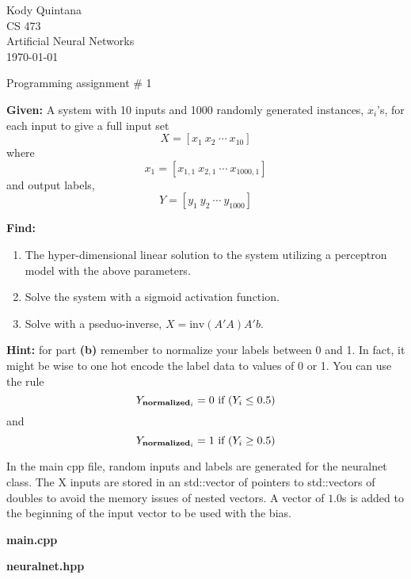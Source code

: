 \documentclass[14pt]{article}
\begin{document}
\begin{flushleft}
 
\large
Kody Quintana\\
CS 473\\
Artificial Neural Networks\\
\today\\
\boldmath

\begin{center}
Programming assignment \# 1
\end{center}

\question
\textbf{Given:}
	A system with 10 inputs and 1000 randomly generated instances, $x_i$'s,
	for each input to give a full input set
	\[X = [x_1  \ x_2  \ \cdots \ x_{10}]\]
	where
	\[x_1 = [x_{1,1} \  x_{2,1}  \ \cdots \  x_{1000,1}]\]
	and output labels,
	\[Y = [y_1 \ y_2 \ \cdots \ y_{1000}]\]
\closequestion

\question
\textbf{Find:}
	\begin{enumerate}[label = \textbf{(\alph*)}]
	\item
		The hyper-dimensional linear solution to the system
		utilizing a perceptron model with the above parameters.
	\item
		Solve the system with a sigmoid activation function.
	\item
		Solve with a pseduo-inverse, $X = \text{inv}(A'A)A'b.$
	\end{enumerate}
\closequestion


\question
\textbf{Hint:}
	for part \textbf{(b)} remember to normalize your labels between 0 and 1.
	In fact, it might be wise to one hot encode the label data to values of 0 or 1.
	You can use the rule
	\[Y_{\text{\textbf{normalized}}_{i}} = 0
	\ \text{if} \
	(Y_i \leq 0.5)\]
	and 
	\[Y_{\text{\textbf{normalized}}_{i}} = 1
	\ \text{if} \
	(Y_i \geq 0.5)\]
\closequestion


In the main cpp file, random inputs and labels are generated for the neuralnet class.
The X inputs are stored in an std::vector of pointers to std::vectors of doubles to avoid the memory issues of nested vectors.
A vector of $1.0$s is added to the beginning of the input vector to be used with the bias.

\textbf{main.cpp}

\textbf{neuralnet.hpp}

\end{flushleft}
\end{document}
